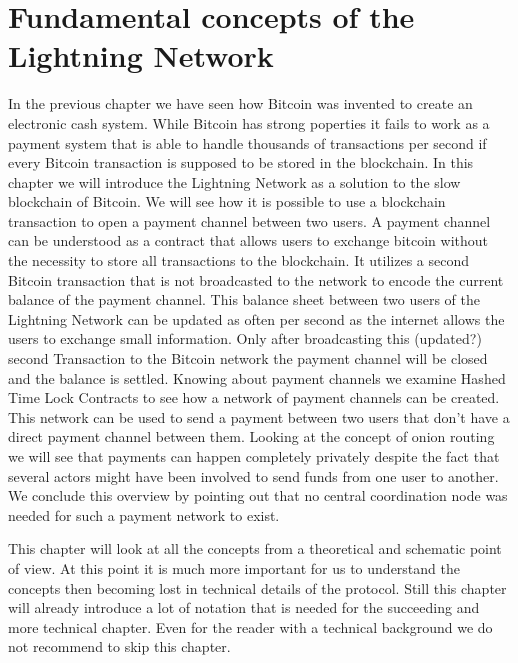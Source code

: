 \documentclass[a4paper,12pt,oneside,openany]{book}
\begin{document}
\chapter{Fundamental concepts of the Lightning Network}
In the previous chapter we have seen how Bitcoin was invented to create an electronic cash system.
While Bitcoin has strong poperties it fails to work as a payment system that is able to handle thousands of transactions per second if every Bitcoin transaction is supposed to be stored in the blockchain.
In this chapter we will introduce the Lightning Network as a solution to the slow blockchain of Bitcoin.
We will see how it is possible to use a blockchain transaction to open a payment channel between two users.
A payment channel can be understood as a contract that allows users to exchange bitcoin without the necessity to store all transactions to the blockchain.
It utilizes a second Bitcoin transaction that is not broadcasted to the network to encode the current balance of the payment channel.
This balance sheet between two users of the Lightning Network can be updated as often per second as the internet allows the users to exchange small information.
Only after broadcasting this (updated?) second Transaction to the Bitcoin network the payment channel will be closed and the balance is settled.
Knowing about payment channels we examine Hashed Time Lock Contracts to see how a network of payment channels can be created.
This network can be used to send a payment between two users that don't have a direct payment channel between them.
Looking at the concept of onion routing we will see that payments can happen completely privately despite the fact that several actors might have been involved to send funds from one user to another.
We conclude this overview by pointing out that no central coordination node was needed for such a payment network to exist.

This chapter will look at all the concepts from a theoretical and schematic point of view.
At this point it is much more important for us to understand the concepts then becoming lost in technical details of the protocol.
Still this chapter will already introduce a lot of notation that is needed for the succeeding and more technical chapter.
Even for the reader with a technical background we do not recommend to skip this chapter.
\end{document}
